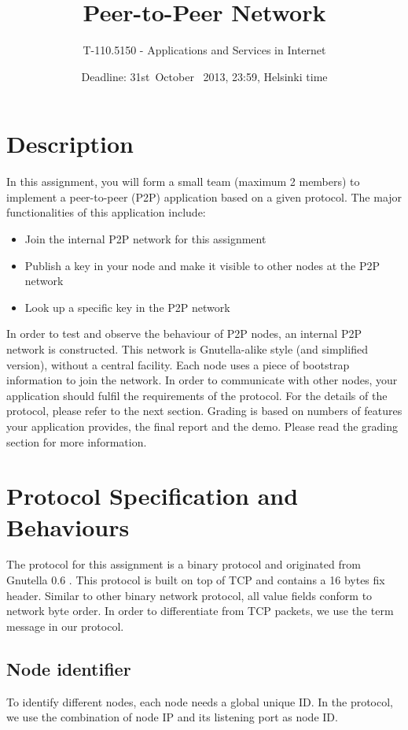 \documentclass[12pt, a4paper]{article}
\date{Deadline: 31st\ October \ 2013, 23:59, Helsinki time}
\title{Peer-to-Peer Network}
\author{T-110.5150 - Applications and Services in Internet}
\begin{document}
\maketitle
\section{Description}
In this assignment, you will form a small team (maximum 2 members) to implement a peer-to-peer (P2P) application based on a given protocol. The major functionalities of this application include:
\begin{itemize}
\item Join the internal P2P network for this assignment
\item Publish a key in your node and make it visible to other nodes at the P2P network
\item Look up a specific key in the P2P network
\end{itemize}

In order to test and observe the behaviour of P2P nodes, an internal P2P network is constructed.
This network is Gnutella-alike style (and simplified version), without a central facility.
Each node uses a piece of bootstrap information to join the network.
In order to communicate with other nodes, your application should fulfil the requirements of the protocol.
For the details of the protocol, please refer to the next section.
Grading is based on numbers of features your application provides, the final report and the demo.
Please read the grading section for more information.


\section{Protocol Specification and Behaviours}
The protocol for this assignment is a binary protocol and originated from Gnutella 0.6 \cite{gnutella}.
This protocol is built on top of TCP and contains a 16 bytes fix header.
Similar to other binary network protocol, all value fields conform to network byte order.
In order to differentiate from TCP packets, we use the term message in our protocol.

\subsection{Node identifier}
To identify different nodes, each node needs a global unique ID. In the protocol, we use the combination of node IP and its listening port as node ID.
\end{document}
